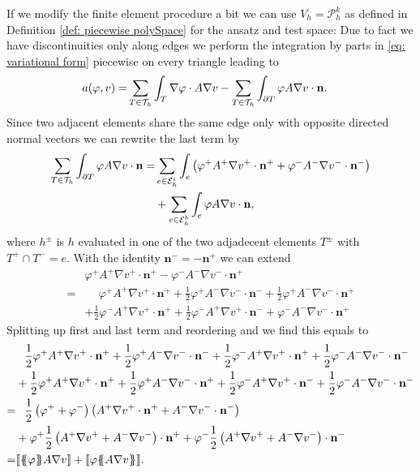 If we modify the finite element procedure a bit we can use $V_h = \mathcal P_h^k$ as defined in Definition \ref*{def: piecewise polySpace} for the ansatz and test space: Due to fact we have discontinuities only along edges we perform the integration by parts in \eqref{eq: variational form} piecewise on every triangle leading to
\begin{align}
	a(\varphi, v) = & \sum_{T \in \mathcal{T}_h} \int_T \nabla \varphi \cdot A \nabla v - \sum_{T \in \mathcal{T}_h} \int_{\partial T} \varphi A \nabla v \cdot \mathbf n.
\end{align}
Since two adjacent elements share the same edge only with opposite directed normal vectors we can rewrite the last term by
\begin{align*}
\sum\limits_{T \in \mathcal{T}_h}\int_{\partial T} \varphi A \nabla v \cdot \mathbf n 
= &\sum\limits_{e \in \mathcal{E}_h^i}\int_{e} \left( \varphi^+ A^+ \nabla v^+ \cdot \mathbf n^+ + \varphi^- A^- \nabla v^- \cdot \mathbf n^- \right) \\
& + \sum\limits_{e \in \mathcal{E}_h^b}\int_{e} \varphi A \nabla v \cdot \mathbf n,
\end{align*}
where $h^\pm $ is $h$ evaluated in one of the two adjadecent elements $T^\pm$ with $T^+ \cap T^- = e$. With the identity $\mathbf n^- = -\mathbf n^+$ we can extend
\begin{align*}
	&\varphi^+ A^+ \nabla v^+ \cdot \mathbf n^+ - \varphi^- A^- \nabla v^- \cdot \mathbf n^+ \\
		= & \phantom{+} \varphi^+ A^+ \nabla v^+ \cdot \mathbf n^+ 
		     + \frac 1 2  \varphi^+ A^- \nabla v^- \cdot \mathbf n^- + \frac 1 2 \varphi^+ A^- \nabla v^- \cdot \mathbf n^+ \\
		& + \frac 1 2  \varphi^- A^+ \nabla v^+ \cdot \mathbf n^+ + \frac 1 2 \varphi^- A^+ \nabla v^+ \cdot \mathbf n^-
		   + \varphi^- A^- \nabla v^- \cdot \mathbf n^+
\end{align*}
Splitting up first and last term and reordering and we find this equals to
\begin{align*}
		 & \phantom{+} \frac 1 2 \varphi^+ A^+ \nabla v^+ \cdot \mathbf n^+ 
		     + \frac 1 2  \varphi^+ A^- \nabla v^- \cdot \mathbf n^- + \frac 1 2  \varphi^- A^+ \nabla v^+ \cdot \mathbf n^+ + \frac 1 2 \varphi^- A^- \nabla v^- \cdot \mathbf n^- \\
		& + \frac 1 2  \varphi^+ A^+ \nabla v^+ \cdot \mathbf n^+  + \frac 1 2 \varphi^+ A^- \nabla v^- \cdot \mathbf n^+ +\frac 1 2 \varphi^- A^+ \nabla v^+ \cdot \mathbf n^- + \frac 1 2 \varphi^- A^- \nabla v^- \cdot \mathbf n^-\\
		    	  = & \phantom{+} \frac 1 2 \left(\varphi^+ + \varphi^- \right) \left(A^+ \nabla v^+ \cdot \mathbf n^+ + A^- \nabla v^- \cdot \mathbf n^- \right) \\
  &+  \varphi^+ \frac 1 2  \left(A^+ \nabla v^+ + A^- \nabla v^-\right) \cdot \mathbf n^+ + \varphi^- \frac 1 2 \left(A^+ \nabla v^+ + A^- \nabla v^-\right) \cdot \mathbf n^- \\
  = &  \jump {\average \varphi  A \nabla v}+ \jump {\varphi \average{ A \nabla v}}.
\end{align*}
